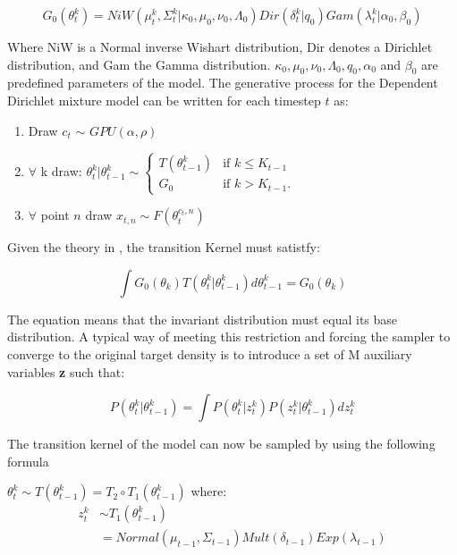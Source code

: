 \documentclass[twoside,hidelinks]{article}
\begin{document}
$$ G_0(\theta_t^k)  = NiW( \mu_t^k, \Sigma_t^k | \kappa_0, \mu_0, \nu_0, \Lambda_0 ) Dir(\delta_t^k | q_0) Gam( \lambda_t^k | \alpha_0, \beta_0) $$

Where NiW is a Normal inverse Wishart distribution, Dir denotes a Dirichlet distribution, and Gam the Gamma distribution. $ \kappa_0, \mu_0, \nu_0, \Lambda_0, q_0,\alpha_0$ and $\beta_0$ are predefined parameters of the model. The generative process for the Dependent Dirichlet mixture model can be written for each timestep $t$ as:

\noindent\makebox[\linewidth]{\rule{\textwidth}{0.4pt}}
\begin{enumerate}
	\item Draw  $c_t$ $\sim$ $GPU(\alpha, \rho) $
	\item $\forall$  k draw: $ \theta_t^k | \theta_{t-1}^k \sim
	\begin{cases} T (\theta_{t-1}^k) &\mbox{if } k \leq K_{t-1} \\
	G_0 & \mbox{if } k > K_{t-1}. \end{cases}$
	\item $\forall$  point $n$ draw $ x_{t,n} \sim F(\theta_t^{c_t,n})$
\end{enumerate}
\noindent\makebox[\linewidth]{\rule{\textwidth}{0.4pt}}
Given the theory in \cite{caron}, the transition Kernel must satistfy:

$$ \int G_0(\theta_k) T(\theta_t^k | \theta_{t-1}^k) d\theta_{t-1}^k =  G_0(\theta_k) $$

The equation means that the invariant distribution must equal its base distribution. A typical way of meeting this restriction and forcing the sampler to converge to the original target density\cite{smc:theory} is to introduce a set of M auxiliary variables \textbf{z} such that:

$$ P(\theta_t^k | \theta_{t-1}^k) =  \int P(\theta_t^k | z_{t}^k)   P(z_t^k| \theta_{t-1}^k) dz_t^k $$

The transition kernel of the model can now be sampled by using the following formula

$\theta_t^k \sim T(\theta_{t-1}^k) = T_2 \circ T_1(\theta_{t-1}^k)$ where:
\begin{equation} \label{eq1}
\begin{split}
z_t^k  & \sim T_1(\theta_{t-1}^k)\\
 & = Normal(\mu_{t-1}, \Sigma_{t-1}) Mult( \delta_{t-1}) Exp( \lambda_{t-1})
\end{split}
\end{equation}
\end{document}
